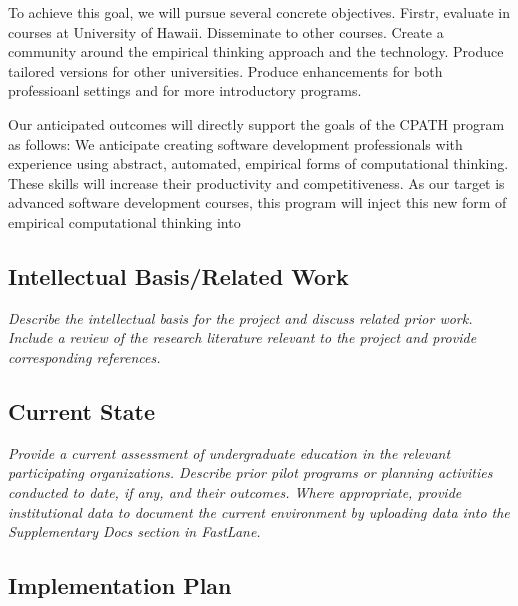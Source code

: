 To achieve this goal, we will pursue several concrete objectives. Firstr, evaluate
in courses at University of Hawaii.  Disseminate to other courses.  Create a community around the empirical thinking approach and the technology.  Produce tailored versions for other universities.  Produce enhancements for both professioanl settings and for more introductory programs. 


Our anticipated outcomes will directly support the goals of the CPATH program as follows:
We anticipate creating software development professionals with experience using abstract, automated, empirical forms of computational thinking.   These skills will increase their productivity and competitiveness. As our target is advanced software development courses, this program will inject this new form of empirical computational thinking into 




\subsection*{Intellectual Basis/Related Work}

{\em Describe the intellectual basis for the project and discuss related prior work.  Include a review of the research literature relevant to the project and provide corresponding references. }

\subsection*{Current State}

{\em Provide a current assessment of undergraduate education in the relevant participating organizations.  Describe prior pilot programs or planning activities conducted to date, if any, and their outcomes.  Where appropriate, provide institutional data to document the current environment by uploading data into the Supplementary Docs section in FastLane.}

\subsection*{Implementation Plan}


